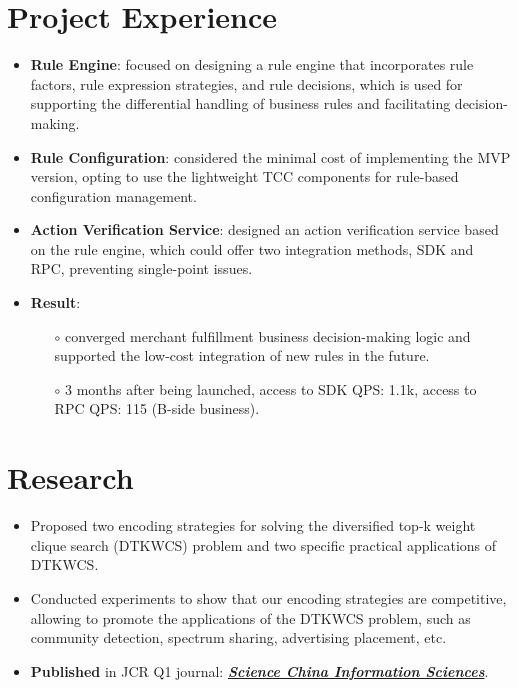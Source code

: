 \documentclass{resume}
\begin{document}
\section{Project Experience}
\begin{itemize}[parsep=0.2ex]
    \item \textbf{Rule Engine}: focused on designing a rule engine that incorporates rule factors, rule expression strategies, 
    and rule decisions, which is used for supporting the differential handling of business rules and facilitating decision-making.
    \item \textbf{Rule Configuration}: considered the minimal cost of implementing the MVP version, opting to use the lightweight 
    TCC components for rule-based configuration management.
    \item \textbf{Action Verification Service}: designed an action verification service based on the rule engine, which could offer 
    two integration methods, SDK and RPC, preventing single-point issues.
    \item \textbf{Result}: 
      \begin{itemize}
          \item[$\circ$] converged merchant fulfillment business decision-making logic and supported the low-cost integration of 
          new rules in the future.
          \item[$\circ$] 3 months after being launched, access to SDK QPS: 1.1k, access to RPC QPS: 115 (B-side business).
      \end{itemize}
\end{itemize}

\section{Research}
\begin{itemize}
    \item Proposed two encoding strategies for solving the diversified top-k weight clique search (DTKWCS) problem and two specific 
    practical applications of DTKWCS. 
    \item Conducted experiments to show that our encoding strategies are competitive, allowing to promote the applications of the 
    DTKWCS problem, such as community detection, spectrum sharing, advertising placement, etc.
    \item \textbf{Published} in JCR Q1 journal: 
    \textbf{\href{https://link.springer.com/article/10.1007/s11432-020-3069-4}{\textit{Science China Information Sciences}}}.
\end{itemize}
\end{document}
